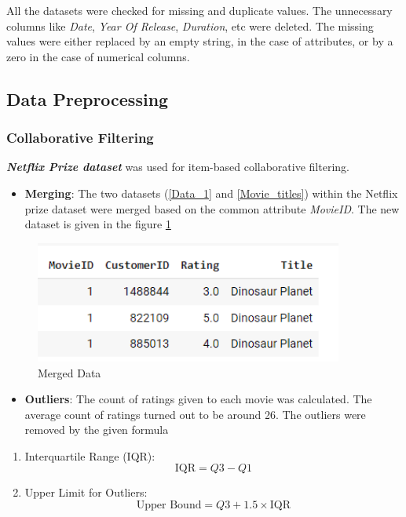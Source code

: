 \documentclass[a4paper,10pt]{article}
\begin{document}
All the datasets were checked for missing and duplicate values. 
The unnecessary columns like \textit{Date}, \textit{Year Of Release}, \textit{Duration}, etc were deleted. The missing values were either replaced by an empty string, in the case of attributes, or by a zero in the case of numerical columns.  


\subsection{Data Preprocessing}

\subsubsection{Collaborative Filtering}
\textit{\textbf{Netflix Prize dataset}} was used for item-based collaborative filtering. 
\begin{itemize}
    \item \textbf{Merging}: The two datasets (\ref{Data_1} and \ref{Movie_titles}) within the Netflix prize dataset were merged based on the common attribute \textit{MovieID}. The new dataset is given in the figure \ref{Movie_merge}
\end{itemize}

\begin{figure}[ht]
\centering
\includegraphics[height=4cm]{figures/movie_data.png}
\caption{Merged Data}
\label{Movie_merge}
\end{figure}


\begin{itemize}
    \item \textbf{Outliers}: The count of ratings given to each movie was calculated. The average count of ratings turned out to be around 26. The outliers were removed by the given formula 
\end{itemize}

\begin{enumerate}
  \item Interquartile Range (IQR):
    \[ \text{IQR} = Q3 - Q1 \]

  \item Upper Limit for Outliers:
    \[ \text{Upper Bound} = Q3 + 1.5 \times \text{IQR} \]
\end{enumerate}
\end{document}
